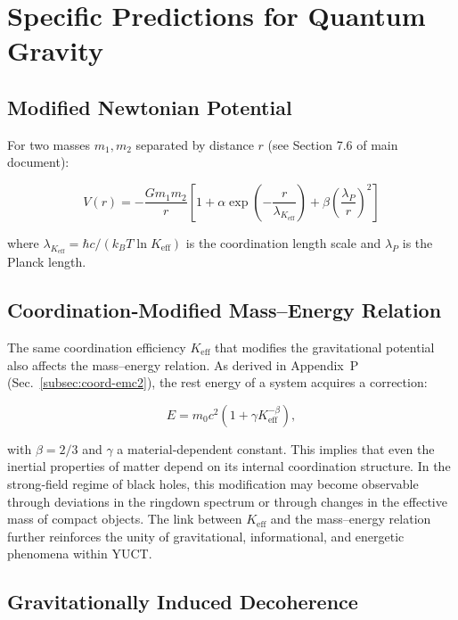 \documentclass[12pt,a4paper]{article}
\theoremstyle{remark}
\newcommand{\Keff}{K_{\mathrm{eff}}}
\begin{document}
	\section{Specific Predictions for Quantum Gravity}
	\label{sec:predictions}
	
	\subsection{Modified Newtonian Potential}
	
	For two masses $m_1, m_2$ separated by distance $r$ (see Section 7.6 of main document):
	
	\begin{equation}
		V(r) = -\frac{G m_1 m_2}{r} \left[ 1 + \alpha \exp\left(-\frac{r}{\lambda_{\Keff}}\right) + \beta \left(\frac{\lambda_P}{r}\right)^2 \right]
	\end{equation}
	
	where $\lambda_{\Keff} = \hbar c / (k_B T \ln \Keff)$ is the coordination length scale and $\lambda_P$ is the Planck length.
	
	\subsection{Coordination‑Modified Mass–Energy Relation}
	\label{subsec:coord-emc2-G}
	
	The same coordination efficiency \(K_{\mathrm{eff}}\) that modifies the gravitational potential also affects the mass–energy relation. As derived in Appendix~P (Sec.~\ref{subsec:coord-emc2}), the rest energy of a system acquires a correction:
	
	\[
	E = m_{0} c^{2} \left(1 + \gamma K_{\mathrm{eff}}^{-\beta}\right),
	\]
	
	with \(\beta = 2/3\) and \(\gamma\) a material‑dependent constant. This implies that even the inertial properties of matter depend on its internal coordination structure. In the strong‑field regime of black holes, this modification may become observable through deviations in the ringdown spectrum or through changes in the effective mass of compact objects. The link between \(K_{\mathrm{eff}}\) and the mass–energy relation further reinforces the unity of gravitational, informational, and energetic phenomena within YUCT.
	
	\subsection{Gravitationally Induced Decoherence}
	
\end{document}
